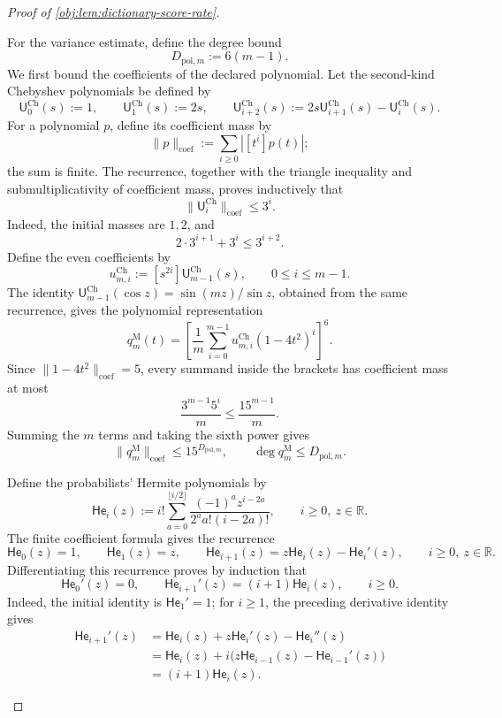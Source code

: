 \begin{proof}[Proof of \cref{obj:lem:dictionary-score-rate}]
\begin{enumerate}
For the variance estimate, define the degree bound
\[
D_{\mathrm{pol},m}:=6(m-1).
\]
We first bound the coefficients of the declared polynomial. Let the second-kind Chebyshev polynomials be defined by
\[
\mathsf U^{\mathrm{Ch}}_0(s):=1,\qquad
\mathsf U^{\mathrm{Ch}}_1(s):=2s,\qquad
\mathsf U^{\mathrm{Ch}}_{i+2}(s)
:=2s\mathsf U^{\mathrm{Ch}}_{i+1}(s)-\mathsf U^{\mathrm{Ch}}_i(s).
\]
For a polynomial \(p\), define its coefficient mass by
\[
\|p\|_{\mathrm{coef}}
:=\sum_{i\ge0}|[t^i]p(t)|;
\]
the sum is finite. The recurrence, together with the triangle inequality and submultiplicativity of coefficient mass, proves inductively that
\[
\|\mathsf U^{\mathrm{Ch}}_i\|_{\mathrm{coef}}\le3^i.
\]
Indeed, the initial masses are \(1,2\), and
\[
2\cdot3^{i+1}+3^i\le3^{i+2}.
\]
Define the even coefficients by
\[
u^{\mathrm{Ch}}_{m,i}:=[s^{2i}]\mathsf U^{\mathrm{Ch}}_{m-1}(s),
\qquad 0\le i\le m-1.
\]
The identity
\(\mathsf U^{\mathrm{Ch}}_{m-1}(\cos z)=\sin(mz)/\sin z\),
obtained from the same recurrence, gives the polynomial representation
\[
q_m^{\mathrm M}(t)
=\left[
\frac1m\sum_{i=0}^{m-1}
u^{\mathrm{Ch}}_{m,i}(1-4t^2)^i
\right]^6.
\]
Since \(\|1-4t^2\|_{\mathrm{coef}}=5\), every summand inside the brackets has coefficient mass at most
\[
\frac{3^{m-1}5^i}{m}\le\frac{15^{m-1}}m.
\]
Summing the \(m\) terms and taking the sixth power gives
\[
\|q_m^{\mathrm M}\|_{\mathrm{coef}}
\le15^{D_{\mathrm{pol},m}},
\qquad
\deg q_m^{\mathrm M}\le D_{\mathrm{pol},m}.
\]

Define the probabilists' Hermite polynomials by
\[
\mathsf{He}_i(z)
:=i!\sum_{a=0}^{\lfloor i/2\rfloor}
\frac{(-1)^a z^{i-2a}}{2^a a!(i-2a)!},
\qquad i\ge0,\ z\in\mathbb R.
\]
The finite coefficient formula gives the recurrence
\[
\mathsf{He}_0(z)=1,\qquad
\mathsf{He}_1(z)=z,\qquad
\mathsf{He}_{i+1}(z)=z\mathsf{He}_i(z)-\mathsf{He}_i'(z),
\qquad i\ge0,\ z\in\mathbb R.
\]
Differentiating this recurrence proves by induction that
\[
\mathsf{He}_0'(z)=0,\qquad
\mathsf{He}_{i+1}'(z)=(i+1)\mathsf{He}_i(z),
\qquad i\ge0.
\]
Indeed, the initial identity is \(\mathsf{He}_1'=1\); for \(i\ge1\), the preceding derivative identity gives
\[
\begin{aligned}
\mathsf{He}_{i+1}'(z)
&=\mathsf{He}_i(z)+z\mathsf{He}_i'(z)-\mathsf{He}_i''(z)\\
&=\mathsf{He}_i(z)
+i\bigl(z\mathsf{He}_{i-1}(z)-\mathsf{He}_{i-1}'(z)\bigr)\\
&=(i+1)\mathsf{He}_i(z).
\end{aligned}
\]


\end{enumerate}
\end{proof}
